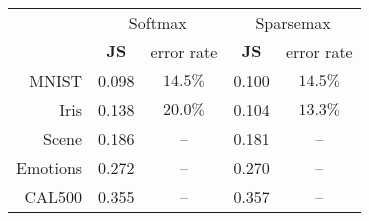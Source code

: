 \begin{tabular}{r|cc|cc}
& \multicolumn{2}{c|}{Softmax} & \multicolumn{2}{c}{Sparsemax} \\
& $\mathbf{JS}$ & error rate & $\mathbf{JS}$ & error rate \\
\hline
MNIST & 0.098 & $14.5 \%$ & 0.100 & $14.5 \%$ \\
Iris & 0.138 & $20.0 \%$ & 0.104 & $13.3 \%$ \\
Scene & 0.186 & -- & 0.181 & -- \\
Emotions & 0.272 & -- & 0.270 & -- \\
CAL500 & 0.355 & -- & 0.357 & -- \\
\end{tabular}

